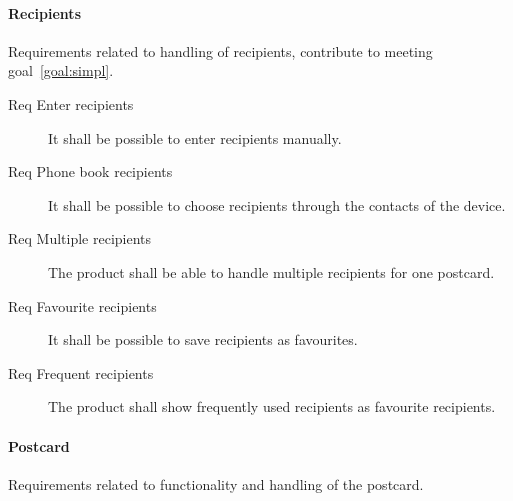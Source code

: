 \documentclass[10pt,a4paper]{article}
\begin{document}
\paragraph{Recipients}
Requirements related to handling of recipients, contribute to meeting goal~\ref{goal:simpl}.

\begin{description}
	\item [Req  Enter recipients] It shall be possible to enter recipients manually.
	\item [Req  Phone book recipients] It shall be possible to choose recipients through the contacts of the device.
	\item [Req  Multiple recipients] The product shall be able to handle multiple recipients for one postcard.
	\item [Req  Favourite recipients] It shall be possible to save recipients as favourites.
	\item [Req  Frequent recipients] The product shall show frequently used recipients as favourite recipients.
\end{description}

\paragraph{Postcard}
Requirements related to functionality and handling of the postcard.
\end{document}
